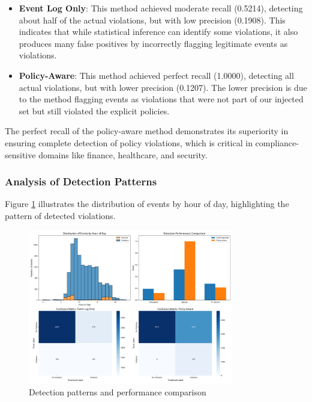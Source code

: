 \begin{itemize}
    \item \textbf{Event Log Only}: This method achieved moderate recall (0.5214), detecting about half of the actual violations, but with low precision (0.1908). This indicates that while statistical inference can identify some violations, it also produces many false positives by incorrectly flagging legitimate events as violations.
    
    \item \textbf{Policy-Aware}: This method achieved perfect recall (1.0000), detecting all actual violations, but with lower precision (0.1207). The lower precision is due to the method flagging events as violations that were not part of our injected set but still violated the explicit policies.
\end{itemize}

The perfect recall of the policy-aware method demonstrates its superiority in ensuring complete detection of policy violations, which is critical in compliance-sensitive domains like finance, healthcare, and security.

\subsubsection{Analysis of Detection Patterns}

Figure \ref{fig:detection-patterns} illustrates the distribution of events by hour of day, highlighting the pattern of detected violations.

\begin{figure}[h]
\centering
\includegraphics[width=0.8\textwidth]{results/availability_violation_detection_results.png}
\caption{Detection patterns and performance comparison}
\label{fig:detection-patterns}
\end{figure}

